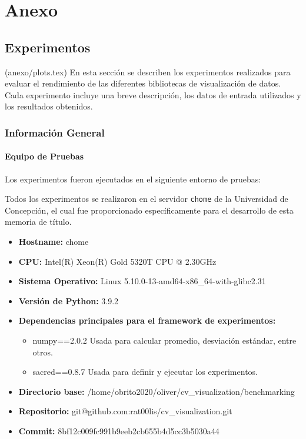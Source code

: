 \section{Anexo}

\subsection{Experimentos}
\label{sec:experimentos}
(anexo/plots.tex)
En esta sección se describen los experimentos realizados para evaluar el rendimiento de las diferentes bibliotecas de visualización de datos. Cada experimento incluye una breve descripción, los datos de entrada utilizados y los resultados obtenidos.

\subsubsection{Información General}
\label{general_info}

\paragraph{Equipo de Pruebas}
Los experimentos fueron ejecutados en el siguiente entorno de pruebas:

Todos los experimentos se realizaron en el servidor \texttt{chome} de la Universidad de Concepción, el cual fue proporcionado específicamente para el desarrollo de esta memoria de título. 

\begin{itemize}
    \item \textbf{Hostname:} chome
    \item \textbf{CPU:} Intel(R) Xeon(R) Gold 5320T CPU @ 2.30GHz
    \item \textbf{Sistema Operativo:} Linux 5.10.0-13-amd64-x86\_64-with-glibc2.31
    \item \textbf{Versión de Python:} 3.9.2
    \item \textbf{Dependencias principales para el framework de experimentos:}
    \begin{itemize}
        \item numpy==2.0.2
            Usada para calcular promedio, desviación estándar, entre otros.
        \item sacred==0.8.7
            Usada para definir y ejecutar los experimentos.
    \end{itemize}
    \item \textbf{Directorio base:} /home/obrito2020/oliver/cv\_visualization/benchmarking
    \item \textbf{Repositorio:} git@github.com:rat00lis/cv\_visualization.git
    \item \textbf{Commit:} 8bf12c009fc991b9eeb2cb655b4d5cc3b5030a44
\end{itemize}


